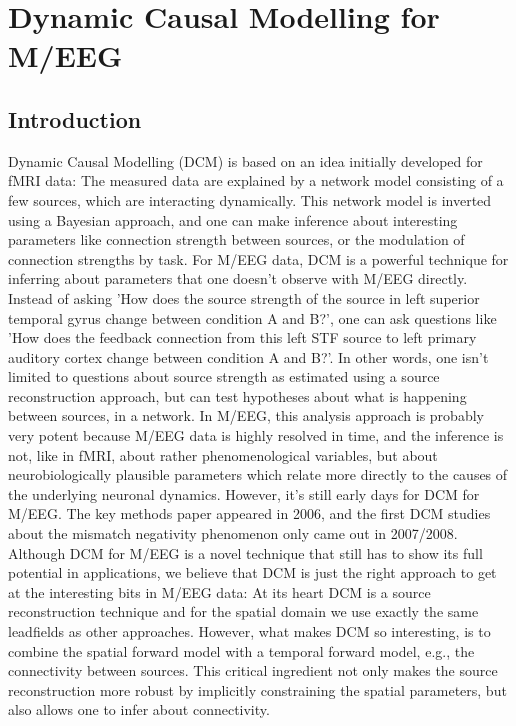 \chapter{Dynamic Causal Modelling for M/EEG \label{Chap:eeg:DCM}}

\section{Introduction}
Dynamic Causal Modelling (DCM) is based on an idea initially developed for fMRI
data: The measured data are explained by a network model consisting of
a few sources, which are interacting dynamically. This network model
is inverted using a Bayesian approach, and one can make inference
about interesting parameters like connection strength between sources,
or the modulation of connection strengths by task. For M/EEG data, DCM
is a powerful technique for inferring about parameters that one
doesn't observe with M/EEG directly. Instead of asking 'How does the
source strength of the source in left superior temporal gyrus change
between condition A and B?', one can ask questions like 'How does the feedback
connection from this left STF source to left primary auditory cortex
change between condition A and B?'. In other words, one isn't limited
to questions about source strength as estimated using a source
reconstruction approach, but can test hypotheses about what is
happening between sources, in a network. In M/EEG, this analysis
approach is probably very potent because M/EEG data is highly resolved
in time, and the inference is not, like in fMRI, about rather
phenomenological variables, but about neurobiologically plausible
parameters which relate more directly to the causes of the underlying 
neuronal dynamics. However, it's still early days for DCM for
M/EEG. The key methods paper appeared in 2006, and the
first DCM studies about the mismatch negativity phenomenon only came out
in 2007/2008. Although DCM for M/EEG is a novel technique that still
has to show its full potential in applications, we believe that DCM is
just the right approach to get at the interesting bits in M/EEG
data: At its heart DCM is a source reconstruction technique and for
the spatial domain we use exactly the same leadfields as other
approaches. However, what makes DCM so interesting, is to combine the
spatial forward model with a temporal forward model, e.g., the
connectivity between sources. This critical ingredient not only makes
the source reconstruction more robust by implicitly constraining the
spatial parameters, but also allows one to infer about connectivity.
